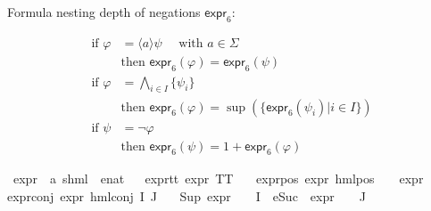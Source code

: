 \begin{isabellebody}
\begin{isamarkuptext}%
Formula nesting depth of negations $\textsf{expr}_6$:

\begin{align*}
    \text{if } \varphi &= \langle a \rangle \psi \quad \text{ with } a \in \Sigma \\
    & \text{then } \textsf{expr}_6(\varphi) = \textsf{expr}_6(\psi) \\
    \text{if } \varphi &= \bigwedge_{i \in I} \{ \psi_i \} \\
    & \text{then } \textsf{expr}_6(\varphi) = \sup(\{\textsf{expr}_6(\psi_i)| i \in I\}) \\
    \text{if } \psi &= \neg \varphi \\
    & \text{then } \textsf{expr}_6(\psi) = 1 + \textsf{expr}_6(\varphi)
\end{align*}%
\end{isamarkuptext}\isamarkuptrue%
\isamarkupfalse%
\ expr{\isacharunderscore}{\kern0pt}{}\ {\isacharcolon}{\kern0pt}{\isacharcolon}{\kern0pt}\ {\isachardoublequoteopen}{\isacharparenleft}{\kern0pt}{\isacharprime}{\kern0pt}a{\isacharcomma}{\kern0pt}\ {\isacharprime}{\kern0pt}s{\isacharparenright}{\kern0pt}hml\ {\isasymRightarrow}\ enat{\isachardoublequoteclose}\isanewline
\ \ \isanewline
expr{\isacharunderscore}{\kern0pt}{}{\isacharunderscore}{\kern0pt}tt{\isacharcolon}{\kern0pt}\ {\isacartoucheopen}expr{\isacharunderscore}{\kern0pt}{}\ TT\ {\isacharequal}{\kern0pt}\ {}{\isacartoucheclose}\ {\isacharbar}{\kern0pt}\isanewline
expr{\isacharunderscore}{\kern0pt}{}{\isacharunderscore}{\kern0pt}pos{\isacharcolon}{\kern0pt}\ {\isacartoucheopen}expr{\isacharunderscore}{\kern0pt}{}\ {\isacharparenleft}{\kern0pt}hml{\isacharunderscore}{\kern0pt}pos\ {\isasymalpha}\ {\isasymphi}{\isacharparenright}{\kern0pt}\ {\isacharequal}{\kern0pt}\ expr{\isacharunderscore}{\kern0pt}{}\ {\isasymphi}{\isacartoucheclose}{\isacharbar}{\kern0pt}\isanewline
expr{\isacharunderscore}{\kern0pt}{}{\isacharunderscore}{\kern0pt}conj{\isacharcolon}{\kern0pt}\ {\isacartoucheopen}expr{\isacharunderscore}{\kern0pt}{}\ {\isacharparenleft}{\kern0pt}hml{\isacharunderscore}{\kern0pt}conj\ I\ J\ {\isasymPhi}{\isacharparenright}{\kern0pt}\ {\isacharequal}{\kern0pt}\ \isanewline
{\isacharparenleft}{\kern0pt}Sup\ {\isacharparenleft}{\kern0pt}{\isacharparenleft}{\kern0pt}expr{\isacharunderscore}{\kern0pt}{}\ {\isasymcirc}\ {\isasymPhi}{\isacharparenright}{\kern0pt}\ {\isacharbackquote}{\kern0pt}\ I\ {\isasymunion}\ {\isacharparenleft}{\kern0pt}{\isacharparenleft}{\kern0pt}eSuc\ {\isasymcirc}\ expr{\isacharunderscore}{\kern0pt}{}\ {\isasymcirc}\ {\isasymPhi}{\isacharparenright}{\kern0pt}\ {\isacharbackquote}{\kern0pt}\ J{\isacharparenright}{\kern0pt}{\isacharparenright}{\kern0pt}{\isacharparenright}{\kern0pt}{\isacartoucheclose}%

\end{isabellebody}
